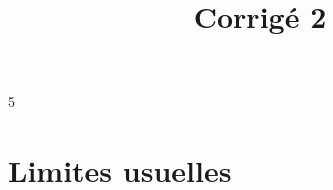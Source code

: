 5\documentclass[a4paper, 12pt, french, twoside]{article}
\title{Corrigé 2}
\newcommand{\Nn}{{\mathbb{N}}}
\begin{document}
\maketitle








\section{Limites usuelles}
\end{document}
